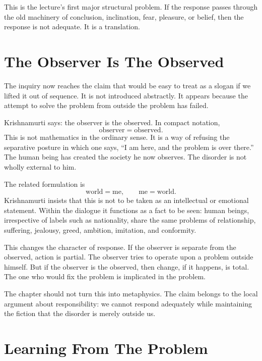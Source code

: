 This is the lecture's first major structural problem. If the response passes through the old machinery of conclusion, inclination, fear, pleasure, or belief, then the response is not adequate. It is a translation.

\section{The Observer Is The Observed}

The inquiry now reaches the claim that would be easy to treat as a slogan if we lifted it out of sequence. It is not introduced abstractly. It appears because the attempt to solve the problem from outside the problem has failed.

Krishnamurti says: the observer is the observed. In compact notation,
\begin{equation}
\text{observer} = \text{observed}.
\end{equation}
This is not mathematics in the ordinary sense. It is a way of refusing the separative posture in which one says, ``I am here, and the problem is over there.'' The human being has created the society he now observes. The disorder is not wholly external to him.

The related formulation is
\begin{equation}
\text{world} = \text{me},
\qquad
\text{me} = \text{world}.
\end{equation}
Krishnamurti insists that this is not to be taken as an intellectual or emotional statement. Within the dialogue it functions as a fact to be seen: human beings, irrespective of labels such as nationality, share the same problems of relationship, suffering, jealousy, greed, ambition, imitation, and conformity.

This changes the character of response. If the observer is separate from the observed, action is partial. The observer tries to operate upon a problem outside himself. But if the observer is the observed, then change, if it happens, is total. The one who would fix the problem is implicated in the problem.

\begin{remark}
The chapter should not turn this into metaphysics. The claim belongs to the local argument about responsibility: we cannot respond adequately while maintaining the fiction that the disorder is merely outside us.
\end{remark}

\section{Learning From The Problem}

